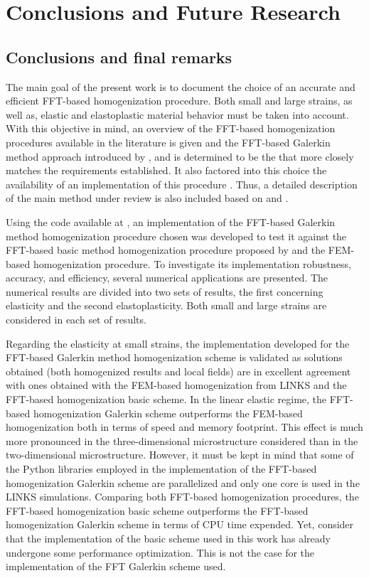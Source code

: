 \chapter{Conclusions and Future Research}

\section{Conclusions and final remarks}

The main goal of the present work is to document the choice of an accurate and efficient FFT-based homogenization procedure.
Both small and large strains, as well as, elastic and elastoplastic material behavior must be taken into account.
With this objective in mind, an overview of the FFT-based homogenization procedures available in the literature is given and the FFT-based Galerkin method approach introduced by \cite{vondrejc_fft-based_2014}, \cite{zeman_finite_2017} and \cite{de_geus_finite_2017} is determined to be the that more closely matches the requirements established.
It also factored into this choice the availability of an implementation of this procedure \citep{}.
Thus, a detailed description of the main method under review is also included based on \cite{zeman_finite_2017} and \cite{de_geus_finite_2017}.

Using the code available at \cite{}, an implementation of the FFT-based Galerkin method homogenization procedure chosen was developed to test it against the FFT-based basic method homogenization procedure proposed by \cite{moulinec_fast_1994} and the FEM-based homogenization procedure.
To investigate its implementation robustness, accuracy, and efficiency, several numerical applications are presented.
The numerical results are divided into two sets of results, the first concerning elasticity and the second elastoplasticity.
Both small and large strains are considered in each set of results.


Regarding the elasticity at small strains, the implementation developed for the FFT-based Galerkin method homogenization scheme is validated as solutions obtained (both homogenized results and local fields) are in excellent agreement with ones obtained with the FEM-based homogenization from LINKS and the FFT-based homogenization basic scheme.
In the linear elastic regime, the FFT-based homogenization Galerkin scheme outperforms the FEM-based homogenization both in terms of speed and memory footprint.
This effect is much more pronounced in the three-dimensional microstructure considered than in the two-dimensional microstructure.
However, it must be kept in mind that some of the Python libraries employed in the implementation of the FFT-based homogenization Galerkin scheme are parallelized and only one core is used in the LINKS simulations.
Comparing both FFT-based homogenization procedures, the FFT-based homogenization basic scheme outperforms the FFT-based homogenization Galerkin scheme in terms of CPU time expended.
Yet, consider that the implementation of the basic scheme used in this work \citep{ferreira_accurate_2020} has already undergone some performance optimization.
This is not the case for the implementation of the FFT Galerkin scheme used.

